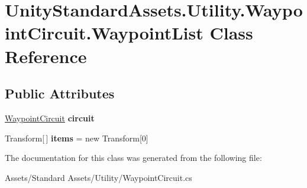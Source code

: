 \hypertarget{class_unity_standard_assets_1_1_utility_1_1_waypoint_circuit_1_1_waypoint_list}{}\section{Unity\+Standard\+Assets.\+Utility.\+Waypoint\+Circuit.\+Waypoint\+List Class Reference}
\label{class_unity_standard_assets_1_1_utility_1_1_waypoint_circuit_1_1_waypoint_list}
\subsection*{Public Attributes}
\begin{DoxyCompactItemize}
\item 
\hyperlink{class_unity_standard_assets_1_1_utility_1_1_waypoint_circuit}{Waypoint\+Circuit} {\bfseries circuit}\hypertarget{class_unity_standard_assets_1_1_utility_1_1_waypoint_circuit_1_1_waypoint_list_a8a024d382de1b36d054562f150533035}{}\label{class_unity_standard_assets_1_1_utility_1_1_waypoint_circuit_1_1_waypoint_list_a8a024d382de1b36d054562f150533035}

\item 
Transform\mbox{[}$\,$\mbox{]} {\bfseries items} = new Transform\mbox{[}0\mbox{]}\hypertarget{class_unity_standard_assets_1_1_utility_1_1_waypoint_circuit_1_1_waypoint_list_af44d62dad0eb5964ba20ec2b9a39372f}{}\label{class_unity_standard_assets_1_1_utility_1_1_waypoint_circuit_1_1_waypoint_list_af44d62dad0eb5964ba20ec2b9a39372f}

\end{DoxyCompactItemize}


The documentation for this class was generated from the following file\+:\begin{DoxyCompactItemize}
\item 
Assets/\+Standard Assets/\+Utility/Waypoint\+Circuit.\+cs\end{DoxyCompactItemize}
